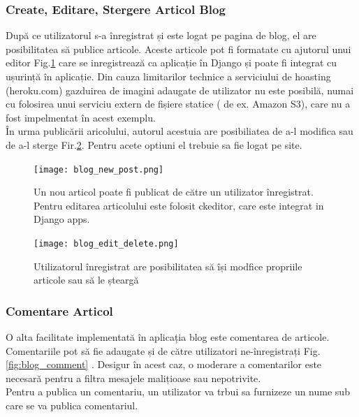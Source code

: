 \documentclass[11pt]{scrartcl} %
\begin{document}

\subsubsection{Create, Editare, Stergere Articol Blog}

După ce utilizatorul s-a înregistrat și este logat pe pagina de blog, el are posibilitatea să publice articole. Aceste articole pot fi formatate cu ajutorul unui editor Fig.\ref{fig:blog_new_post} care se inregistrează ca aplicație în Django și poate fi integrat cu ușurință în aplicație. Din cauza limitarilor technice a serviciului de hoasting (heroku.com) gazduirea de imagini adaugate de utilizator nu este posibilă, numai cu folosirea unui serviciu extern de fișiere statice ( de ex. Amazon S3), care nu a fost impelmentat în acest exemplu.\\
În urma publicării aricolului, autorul acestuia are posibiliatea de a-l modifica sau de a-l sterge Fir.\ref{fig:blog_edit}. Pentru acete optiuni el trebuie sa fie logat pe site.

\begin{figure}[h] %
	\centering
	\texttt{[image: blog\_new\_post.png]} %
	\caption{Un nou articol poate fi publicat de către un utilizator înregistrat. Pentru editarea articolului este folosit ckeditor, care este integrat in Django apps.}
	\label{fig:blog_new_post}
\end{figure}

\begin{figure}[h] %
	\centering
	\texttt{[image: blog\_edit\_delete.png]} %
	\caption{Utilizatorul înregistrat are posibilitatea să își modfice propriile articole sau să le șteargă}
	\label{fig:blog_edit}
\end{figure}




\subsubsection{Comentare Articol}

O alta facilitate implementată în aplicația blog este comentarea de articole. Comentariile pot să fie adaugate și de către utilizatori ne-înregistrați Fig.\ref{fig:blog_comment} . Desigur în acest caz, o moderare a comentarilor este necesară pentru a filtra mesajele malițioase sau nepotrivite.\\
Pentru a publica un comentariu, un utilizator va trbui sa furnizeze un nume sub care se va publica comentariul.
\end{document}
